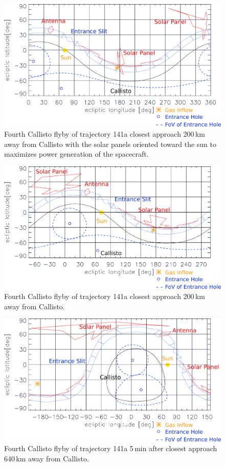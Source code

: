 		\begin{figure}[h!]
			\centering
			\includegraphics[width = .7\textwidth]{Bilder/NIM_pointing_2031JAN15195200_tilt.png}
			\caption{Fourth Callisto flyby of trajectory 141a \cite{SOC_Crema3p2} closest approach 200\,km away from Callisto with the solar panels oriented toward the sun to maximizes power generation of the spacecraft.}
			\label{fig:FlybyCal1952sol}
		\end{figure}
		\begin{figure}[h!]
			\centering
			\includegraphics[width = .7\textwidth]{Bilder/NIM_pointing_2031JAN15195200.png}
			\caption{Fourth Callisto flyby of trajectory 141a \cite{SOC_Crema3p2} closest approach 200\,km away from Callisto.}
			\label{fig:FlybyCal1952}
		\end{figure}
		\begin{figure}[h!]
			\centering
			\includegraphics[width = .7\textwidth]{Bilder/NIM_pointing_2031JAN15195700.png}
			\caption{Fourth Callisto flyby of trajectory 141a \cite{SOC_Crema3p2} 5\,min after closest approach 640\,km away from Callisto.}
			\label{fig:FlybyCal1957}
		\end{figure}
